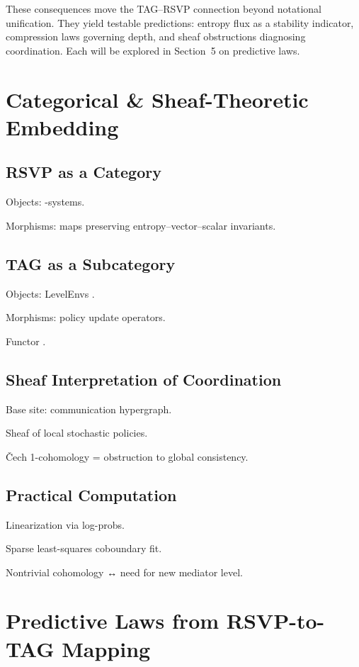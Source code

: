 \documentclass[11pt,a4paper]{article}
\begin{document}
\medskip
These consequences move the TAG--RSVP connection beyond notational unification.
They yield testable predictions: entropy flux as a stability indicator,
compression laws governing depth, and sheaf obstructions diagnosing
coordination. Each will be explored in Section~5 on predictive laws.

\section{Categorical \& Sheaf-Theoretic Embedding}

\subsection{RSVP as a Category}

Objects: -systems.

Morphisms: maps preserving entropy–vector–scalar invariants.

\subsection{TAG as a Subcategory}

Objects: LevelEnvs .

Morphisms: policy update operators.

Functor .

\subsection{Sheaf Interpretation of Coordination}

Base site: communication hypergraph.

Sheaf of local stochastic policies.

Čech 1-cohomology = obstruction to global consistency.

\subsection{Practical Computation}

Linearization via log-probs.

Sparse least-squares coboundary fit.

Nontrivial cohomology ↔ need for new mediator level.

\section{Predictive Laws from RSVP-to-TAG Mapping}
\end{document}
